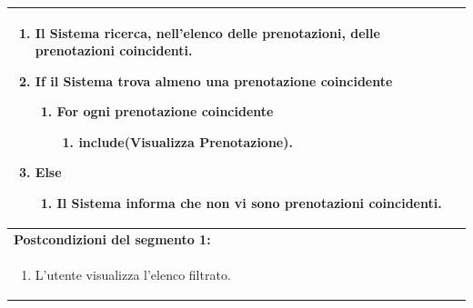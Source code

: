 \documentclass{article}
\begin{document}
\begin{table}[H]
\begin{tabular}{|p{\linewidth}|}
                        \begin{enumerate}
                            \item Il Sistema ricerca, nell'elenco delle prenotazioni, delle prenotazioni coincidenti.
                            \item \textbf{If} il Sistema trova almeno una prenotazione coincidente
                            \begin{enumerate}
                                \item \textbf{For} ogni prenotazione coincidente
                                \begin{enumerate}
                                    \item \textbf{include}(Visualizza Prenotazione).
                                \end{enumerate}
                            \end{enumerate}
                            \item \textbf{Else}
                            \begin{enumerate}
                                \item Il Sistema informa che non vi sono prenotazioni coincidenti.
                            \end{enumerate}
                        \end{enumerate} \\
                        \hline
                        \cellcolor{gray!20}
                        \textbf{Postcondizioni del segmento 1:} \\
                        \cellcolor{gray!20}
                        \begin{minipage}{\linewidth}
                            \begin{enumerate}
                                \item L'utente visualizza l'elenco filtrato.
                            \end{enumerate}
                        \end{minipage} \\
                        \hline
                    \end{tabular}
                \end{table}
\end{document}
